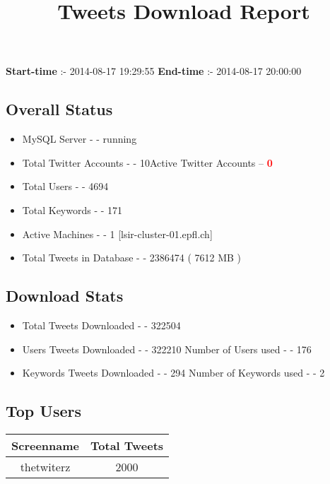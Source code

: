 \documentclass{article}\usepackage[T1]{fontenc}
\begin{document}
\title{\textbf{Tweets Download Report}}
               \date{}
                \maketitle
               \centerline{\textbf{Start-time} :- 2014-08-17 19:29:55 \hspace{40pt} \textbf{End-time} :- 2014-08-17 20:00:00}               \subsection*{Overall Status}                \begin{itemize}                \item MySQL Server - - running               \item Total Twitter Accounts - - 10\newline Active Twitter Accounts -- \textcolor{red}{\textbf{0}}               \item Total Users - - 4694               \item Total Keywords - - 171               \item Active Machines - - 1 [lsir-cluster-01.epfl.ch]               \item Total Tweets in Database - - 2386474 ( 7612 MB )               \end{itemize}               \subsection*{Download Stats}                \begin{itemize}                \item Total Tweets Downloaded - - 322504               \item Users Tweets Downloaded - - 322210 \newline Number of Users used - - 176               \item Keywords Tweets Downloaded - - 294 \newline Number of Keywords used - - 2              \end{itemize}              \subsection*{Top Users}\begin{tabular}{|c|c|}         \hline         Screenname & Total Tweets \\ 
 \hline
thetwiterz & 2000\\ 

\end{tabular}
\end{document}
